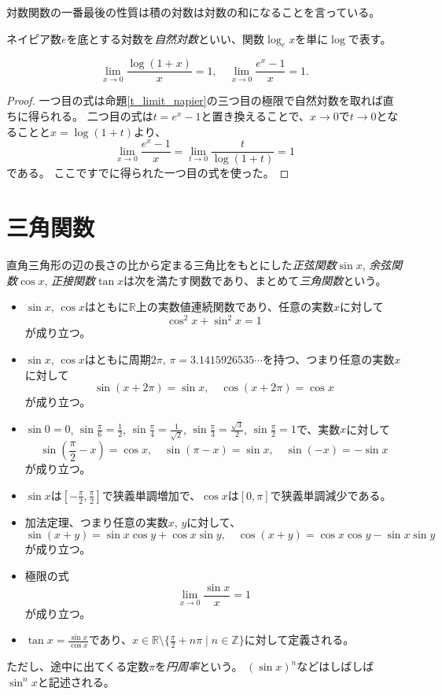 対数関数の一番最後の性質は積の対数は対数の和になることを言っている。

ネイピア数$e$を底とする対数を\emph{自然対数}といい、関数$\log_e x$を単に$\log$で表す。

\begin{proposition}
$$
\lim_{x \to 0}\frac{\log(1+x)}{x} = 1,
\quad \lim_{x \to 0}\frac{e^x-1}{x} = 1.
$$
\end{proposition}

\begin{proof}
一つ目の式は命題\ref{t_limit_napier}の三つ目の極限で自然対数を取れば直ちに得られる。
二つ目の式は$t = e^x-1$と置き換えることで、$x \to 0$で$t \to 0$となることと$x = \log(1+t)$より、
$$
\lim_{x \to 0}\frac{e^x-1}{x} = \lim_{t \to 0}\frac{t}{\log(1+t)} = 1
$$
である。
ここですでに得られた一つ目の式を使った。
\end{proof}

\section{三角関数}

直角三角形の辺の長さの比から定まる三角比をもとにした\emph{正弦関数}$\sin x$, \emph{余弦関数}$\cos x$, \emph{正接関数}$\tan x$は次を満たす関数であり、まとめて\emph{三角関数}という。
\begin{itemize}
\item
$\sin x$, $\cos x$はともに$\mathbb{R}$上の実数値連続関数であり、任意の実数$x$に対して
$$
\cos^2 x+\sin^2 x = 1
$$
が成り立つ。
\item
$\sin x$, $\cos x$はともに周期$2\pi$, $\pi = 3.1415926535\cdots$を持つ、つまり任意の実数$x$に対して
$$
\sin(x+2\pi) = \sin x, \quad \cos(x+2\pi) = \cos x
$$
が成り立つ。
\item
$\sin 0 = 0$, $\sin \frac{\pi}{6} = \frac{1}{2}$, $\sin \frac{\pi}{4} = \frac{1}{\sqrt{2}}$, $\sin \frac{\pi}{3} = \frac{\sqrt{3}}{2}$, $\sin \frac{\pi}{2} = 1$で、実数$x$に対して
$$
\sin\left(\frac{\pi}{2}-x\right) = \cos x, \quad \sin(\pi-x) = \sin x, \quad \sin(-x) = -\sin x
$$
が成り立つ。
\item
$\sin x$は$[-\frac{\pi}{2}, \frac{\pi}{2}]$で狭義単調増加で、$\cos x$は$[0, \pi]$で狭義単調減少である。
\item
加法定理、つまり任意の実数$x$, $y$に対して、
$$
\sin(x+y) = \sin x\cos y+\cos x\sin y,
\quad \cos(x+y) = \cos x\cos y-\sin x\sin y
$$
が成り立つ。
\item
極限の式
$$
\lim_{x \to 0}\frac{\sin x}{x} = 1
$$
が成り立つ。
\item
$\tan x = \frac{\sin x}{\cos x}$であり、$x \in \mathbb{R}\setminus\{ \frac{\pi}{2}+n\pi \mid n \in \mathbb{Z}\}$に対して定義される。
\end{itemize}
ただし、途中に出てくる定数$\pi$を\emph{円周率}という。
$(\sin x)^n$などはしばしば$\sin^n x$と記述される。

